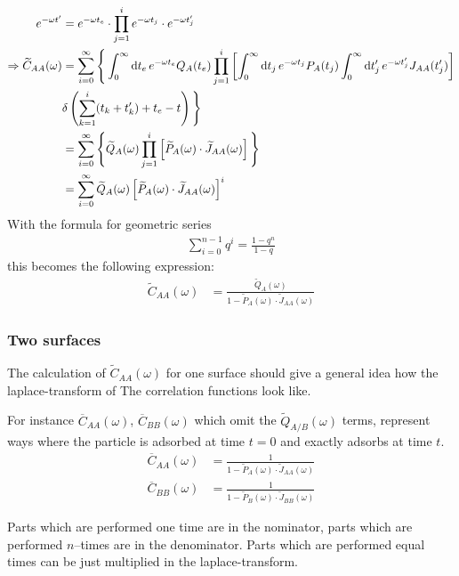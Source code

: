 \documentclass[a4paper, parskip=half]{scrartcl}
\newcommand{\diff}{\mathop{}\!\mathrm{d}}
\begin{document}
\begin{align}
e^{-\omega t'} &= e^{-\omega t_e} \cdot \prod_{j=1}^i e^{-\omega t_j} \cdot e^{-\omega t_j'}\\
\Rightarrow  \widetilde{C}_{AA}(\omega) &= \sum_{i=0}^\infty \Bigg\lbrace \int_0^\infty \diff t_e\, e^{-\omega t_e} Q_A(t_e) \prod_{j=1}^i \left[ \int_0^\infty \diff t_j\, e^{-\omega t_j} P_A(t_j) \int_0^\infty \diff t_j'\, e^{-\omega t_j'} J_{AA}(t_j')\right]\notag\\ 
&\delta \left(\sum_{k=1}^i(t_k+t_k') + t_e - t \right) \Bigg\rbrace\\
&= \sum_{i=0}^\infty \Bigg\lbrace \widetilde{Q}_A(\omega) \prod_{j=1}^i \left[\widetilde{P}_A(\omega) \cdot \widetilde{J}_{AA}(\omega) \right]  \Bigg\rbrace \\
&= \sum_{i=0}^\infty \widetilde{Q}_A(\omega) \left[\widetilde{P}_A(\omega) \cdot \widetilde{J}_{AA}(\omega) \right]^i
\end{align}
With the formula for geometric series 
\begin{align}
\sum_{i=0}^{n-1}q^i = \frac{1-q^n}{1-q} 
\end{align}
this becomes the following expression:
\begin{align}
\widetilde{C}_{AA}(\omega) &= \frac{\widetilde{Q}_A(\omega)}{1-\widetilde{P}_A(\omega) \cdot \widetilde{J}_{AA}(\omega)}
\end{align}
\subsubsection{Two surfaces}
The calculation of $\widetilde{C}_{AA}(\omega)$ for one surface should give a general idea how the laplace-transform of The correlation functions look like.

For instance $\overline{C}_{AA}(\omega)$, $\overline{C}_{BB}(\omega)$ which omit the $\widetilde{Q}_{A/B}(\omega)$ terms, represent ways where the particle is adsorbed at time $t=0$ and exactly adsorbs at time $t$. 
\begin{align}
\overline{C}_{AA}(\omega) &= \frac{1}{1-\widetilde{P}_A(\omega) \cdot \widetilde{J}_{AA}(\omega)} \\
\overline{C}_{BB}(\omega) &= \frac{1}{1-\widetilde{P}_B(\omega) \cdot \widetilde{J}_{BB}(\omega)} 
\end{align}

Parts which are performed one time are in the nominator, parts which are performed $n$--times are in the denominator. Parts which are performed equal times can be just multiplied in the laplace-transform.
\end{document}
